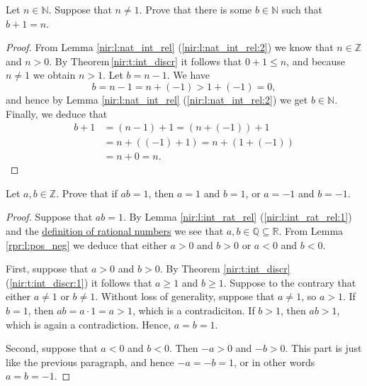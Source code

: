 \addtocounter{exercise}{1}
\Newpage
\begin{exercise} %
	Let $n \in \mathbb{N}$. Suppose that $n \neq 1$. Prove that there is some $b \in \mathbb{N}$ such that $b + 1 = n$.
\end{exercise}

\begin{proof}
	From Lemma \ref{nir:l:nat_int_rel} (\ref{nir:l:nat_int_rel:2}) we know that $n \in \mathbb{Z}$ and $n > 0$. By Theorem\,\ref{nir:t:int_discr} it follows that $0 + 1 \leq n$, and because $n \neq 1$ we obtain $n > 1$. Let $b = n - 1$. We have
	$$
		b = n - 1 = n + (-1) > 1 + (-1) = 0,
	$$
	and hence by Lemma \ref{nir:l:nat_int_rel} (\ref{nir:l:nat_int_rel:2}) we get $b \in \mathbb{N}$. Finally, we deduce that
	\begin{align*}
		b + 1 & = (n - 1) + 1 = (n + (-1)) + 1    \\
		      & = n + ((-1) + 1) = n + (1 + (-1)) \\
		      & = n + 0 = n.
	\end{align*}
\end{proof}


\Newpage
\begin{exercise} %
	Let $a, b \in \mathbb{Z}$. Prove that if $a b = 1$, then $a = 1$ and $b = 1$, or $a = -1$ and $b = -1$.
\end{exercise}

\begin{proof}
	Suppose that $a b = 1$. By Lemma \ref{nir:l:int_rat_rel} (\ref{nir:l:int_rat_rel:1}) and the \hyperref[nir:d:rat_irrat]{definition of rational numbers} we see that $a, b \in \mathbb{Q} \subseteq \mathbb{R}$. From Lemma \ref{rpr:l:pos_neg} we deduce that either $a > 0$ and $b > 0$ or $a < 0$ and $b < 0$.

	First, suppose that $a > 0$ and $b > 0$. By Theorem \ref{nir:t:int_discr} (\ref{nir:t:int_discr:1}) it follows that $a \geq 1$ and $b \geq 1$. Suppose to the contrary that either $a \neq 1$ or $b \neq 1$. Without loss of generality, suppose that $a \neq 1$, so $a > 1$. If $b = 1$, then $a b = a \cdot 1 = a > 1$, which is a contradiciton. If $b > 1$, then $a b > 1$, which is again a contradiction. Hence, $a = b = 1$.

	Second, suppose that $a < 0$ and $b < 0$. Then $-a > 0$ and $-b > 0$. This part is just like the previous paragraph, and hence $-a = -b = 1$, or in other words $a = b = -1$.
\end{proof}


